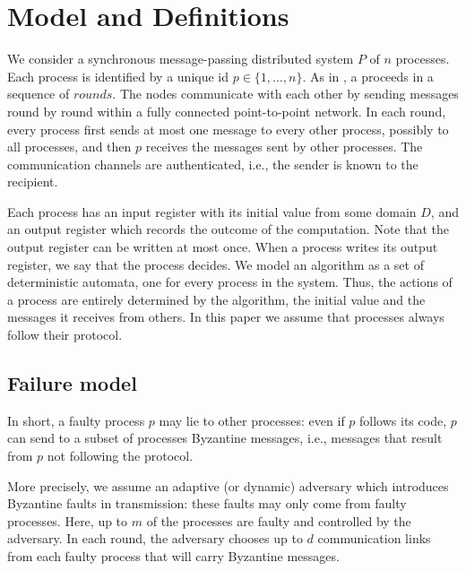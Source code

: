 \section{Model and Definitions}
 
We consider a synchronous message-passing distributed system $P$ of $n$ processes. 
Each process is
identified by a unique id $p \in \{ 1, \ldots ,n \}$.  
As in {\cite{lamport1982byzantine,toueg1984simple}}, a
{} proceeds in a sequence of $rounds$.    
 The nodes communicate
with each other by sending messages round by round within a fully
connected 
point-to-point network.
In each round, every process first sends at most one message to every other process, possibly to all processes, 
and then $p$ receives the messages sent
by other  processes. The communication channels are authenticated, i.e., the sender is known to the recipient. 

Each process has
an input register with its initial value from some domain $D$, and an
output register  
which records the outcome of the computation.
Note that the output register can be written at most once. When a
process writes its output register, we say that the process decides.
We model an algorithm as a set of deterministic automata, one for
every process in the system. 
Thus, the actions of a process are entirely determined by the
algorithm, the initial value and the messages it receives from others. 
In this paper we assume that processes always follow their protocol.


\subsection{Failure model}
In short, a faulty process $p$ may lie to other processes: even if $p$ follows its code, $p$ can send to a subset of processes Byzantine messages, i.e., messages that result from $p$ not following the protocol.

More precisely, we assume an adaptive (or dynamic) adversary
which introduces Byzantine faults in transmission: these faults may
only come from faulty processes. Here, up to $m$ of the
processes are 
faulty and controlled by the adversary. In each round, the adversary chooses
up to $d$ communication links from each faulty process that
will carry Byzantine messages. 


